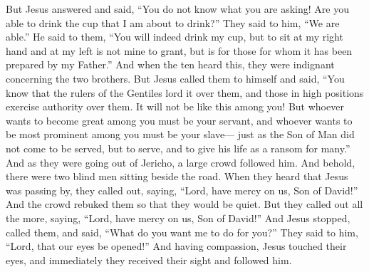 \begin{biblechapter}
\verse But Jesus answered and said, “You do not know what you are asking! Are you able to drink the cup that I am about to drink?” They said to him, “We are able.”
\verse He said to them, “You will indeed drink my cup, but to sit at my right hand and at my left is not mine to grant, but is for those for whom it has been prepared by my Father.”
\verse And when the ten heard this, they were indignant concerning the two brothers.
\verse But Jesus called them to himself and said, “You know that the rulers of the Gentiles lord it over them, and those in high positions exercise authority over them.
\verse It will not be like this among you! But whoever wants to become great among you must be your servant,
\verse and whoever wants to be most prominent among you must be your slave—
\verse just as the Son of Man did not come to be served, but to serve, and to give his life as a ransom for many.”
 And as they were going out of Jericho, a large crowd followed him.
\verse And behold, there were two blind men sitting beside the road. When they heard that Jesus was passing by, they called out, saying, “Lord, have mercy on us, Son of David!”
\verse And the crowd rebuked them so that they would be quiet. But they called out all the more, saying, “Lord, have mercy on us, Son of David!”
\verse And Jesus stopped, called them, and said, “What do you want me to do for you?”
\verse They said to him, “Lord, that our eyes be opened!”
\verse And having compassion, Jesus touched their eyes, and immediately they received their sight and followed him.
\end{biblechapter}


